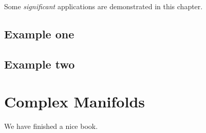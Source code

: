 \documentclass[
]{book}
\begin{document}
Some \emph{significant} applications are demonstrated in this chapter.

\hypertarget{example-one}{%
\section{Example one}\label{example-one}}

\hypertarget{example-two}{%
\section{Example two}\label{example-two}}

\hypertarget{complex-manifolds}{%
\chapter{Complex Manifolds}\label{complex-manifolds}}

We have finished a nice book.

  
\end{document}

